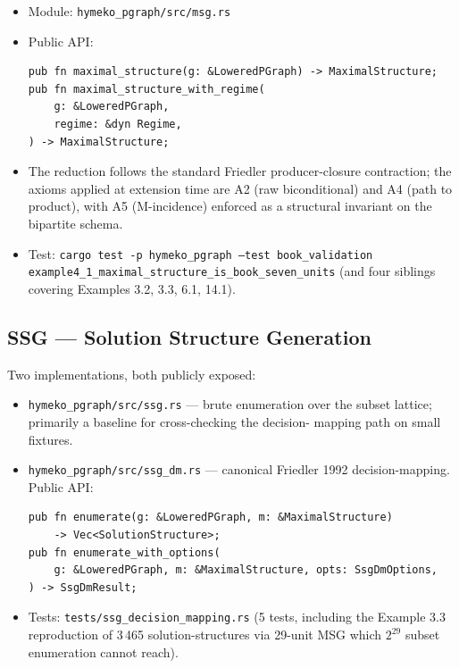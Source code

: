 \documentclass[11pt]{article}
\begin{document}
\begin{itemize}[leftmargin=2em,itemsep=0pt]
  \item Module: \texttt{hymeko\_pgraph/src/msg.rs}
  \item Public API:
\begin{lstlisting}[style=ruststyle]
pub fn maximal_structure(g: &LoweredPGraph) -> MaximalStructure;
pub fn maximal_structure_with_regime(
    g: &LoweredPGraph,
    regime: &dyn Regime,
) -> MaximalStructure;
\end{lstlisting}
  \item The reduction follows the standard Friedler producer-closure
        contraction; the axioms applied at extension time are A2 (raw
        biconditional) and A4 (path to product), with A5 (M-incidence)
        enforced as a structural invariant on the bipartite schema.
  \item Test: \texttt{cargo test -p hymeko\_pgraph --test book\_validation example4\_1\_maximal\_structure\_is\_book\_seven\_units}
        (and four siblings covering Examples 3.2, 3.3, 6.1, 14.1).
\end{itemize}

\subsection*{SSG --- Solution Structure Generation}

Two implementations, both publicly exposed:

\begin{itemize}[leftmargin=2em,itemsep=0pt]
  \item \texttt{hymeko\_pgraph/src/ssg.rs} --- brute enumeration over the subset
        lattice; primarily a baseline for cross-checking the decision-
        mapping path on small fixtures.
  \item \texttt{hymeko\_pgraph/src/ssg\_dm.rs} --- canonical Friedler 1992
        decision-mapping. Public API:
\begin{lstlisting}[style=ruststyle]
pub fn enumerate(g: &LoweredPGraph, m: &MaximalStructure)
    -> Vec<SolutionStructure>;
pub fn enumerate_with_options(
    g: &LoweredPGraph, m: &MaximalStructure, opts: SsgDmOptions,
) -> SsgDmResult;
\end{lstlisting}
  \item Tests: \texttt{tests/ssg\_decision\_mapping.rs} (5 tests, including the
        Example 3.3 reproduction of 3\,465 solution-structures via
        29-unit MSG which $2^{29}$ subset enumeration cannot reach).
\end{itemize}
\end{document}
